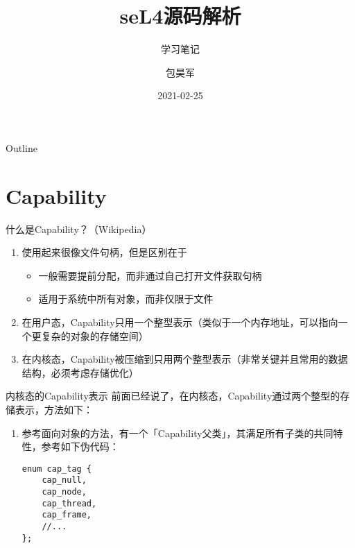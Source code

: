 \documentclass[presentation,dvipdfmx,CJKbookmarks]{beamer}
\date{2021-02-25}
\begin{document}
\begin{CJK*}{UTF8}{simsun}

\title{seL4\thinspace 源码解析}
\subtitle{学习笔记}
\author{包昊军}

\maketitle
\begin{frame}{Outline}
\tableofcontents
\end{frame}

\CJKtilde

\section{Capability}
\label{sec:org07db88d}
\begin{frame}[label={sec:org91f5184}]{什么是\thinspace Capability？（Wikipedia）}
\begin{enumerate}
\item 使用起来很像文件句柄，但是区别在于

\begin{itemize}
\item 一般需要提前分配，而非通过自己打开文件获取句柄
\item 适用于系统中所有对象，而非仅限于文件
\end{itemize}

\item 在用户态，Capability\thinspace 只用一个整型表示（类似于一个内存地址，可以指向一个更复杂的对象的存储空间）

\item 在内核态，Capability\thinspace 被压缩到只用两个整型表示（非常关键并且常用的数据结构，必须考虑存储优化）
\end{enumerate}
\end{frame}

\begin{frame}[label={sec:org5b08469},fragile]{内核态的\thinspace Capability\thinspace 表示}
 前面已经说了，在内核态，Capability\thinspace 通过两个整型的存储表示，方法如下：

\begin{enumerate}
\item 参考面向对象的方法，有一个「Capability\thinspace 父类」，其满足所有子类的共同特性，参考如下伪代码：

\begin{verbatim}
enum cap_tag {
    cap_null,
    cap_node,
    cap_thread,
    cap_frame,
    //...
};


\end{verbatim}
\end{enumerate}
\end{frame}
\end{CJK*}
\end{document}
